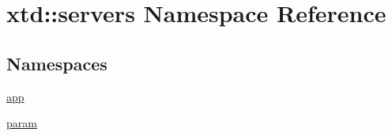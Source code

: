 \hypertarget{namespacextd_1_1servers}{}\section{xtd\+:\+:servers Namespace Reference}
\label{namespacextd_1_1servers}
\subsection*{Namespaces}
\begin{DoxyCompactItemize}
\item 
 \hyperlink{namespacextd_1_1servers_1_1app}{app}
\item 
 \hyperlink{namespacextd_1_1servers_1_1param}{param}
\end{DoxyCompactItemize}
